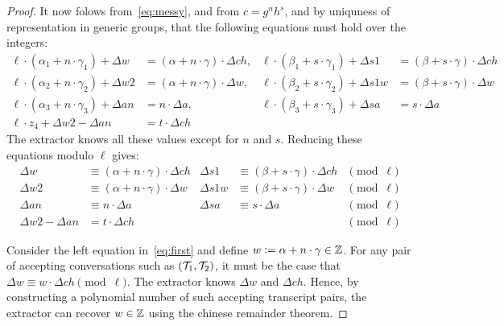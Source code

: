 \documentclass[11pt]{article}
\begin{document}
\begin{proof}
It now folows from~\eqref{eq:messy}, and from $c = g^n h^s$, 
and by uniquness of representation in generic groups,
that the following equations must hold over the integers:
\begin{align*}
  \ell \cdot (\alpha_1 + n \cdot \gamma_1) + \Delta w & = (\alpha + n \cdot \gamma) \cdot \Delta \mathit{ch},  &
  \ell \cdot (\beta_1 + s \cdot \gamma_1) + \Delta \mathit{s1} & = (\beta + s \cdot \gamma) \cdot \Delta \mathit{ch}  
\\
  \ell \cdot (\alpha_2 + n \cdot \gamma_2) + \Delta \mathit{w2} & = (\alpha + n \cdot \gamma) \cdot \Delta w,  &
  \ell \cdot (\beta_2 + s \cdot \gamma_2) + \Delta \mathit{s1w} & = (\beta + s \cdot \gamma) \cdot \Delta w   
\\
  \ell \cdot (\alpha_3 + n \cdot \gamma_3) + \Delta \mathit{an} & = n \cdot \Delta a,  & 
  \ell \cdot (\beta_3 + s \cdot \gamma_3) + \Delta \mathit{sa} & = s \cdot \Delta a   
\\
  \ell \cdot z_4 + \Delta \mathit{w2} - \Delta \mathit{an} & = t \cdot \Delta \mathit{ch} 
\end{align*}
The extractor knows all these values except for $n$ and $s$.
Reducing these equations modulo $\ell$ gives:
\begin{align}
  \Delta w & \equiv (\alpha + n \cdot \gamma) \cdot \Delta \mathit{ch}  &
  \Delta \mathit{s1} & \equiv (\beta + s \cdot \gamma) \cdot \Delta \mathit{ch}  & \pmod{\ell} 
\label{eq:first} \\
  \Delta \mathit{w2} & \equiv (\alpha + n \cdot \gamma) \cdot \Delta w  &
  \Delta \mathit{s1w} & \equiv (\beta + s \cdot \gamma) \cdot \Delta w   & \pmod{\ell} 
\label{eq:second} \\
  \Delta \mathit{an} & \equiv n \cdot \Delta a  & 
  \Delta \mathit{sa} & \equiv s \cdot \Delta a   & \pmod{\ell} 
\label{eq:third} \\
  \Delta \mathit{w2} - \Delta \mathit{an} & = t \cdot \Delta \mathit{ch} 
      &&& \pmod{\ell} 
\label{eq:fourth} 
\end{align}

Consider the left equation in~\eqref{eq:first}
and define $w \mathrel{\mathop:}= \alpha + n \cdot \gamma \in \mathbb Z$.
For any pair of accepting conversations such as $({\cal T}_1, {\cal T}_2)$,
it must be the case that 
$\Delta w \equiv w \cdot \Delta \mathit{ch} \pmod{\ell}$.
The extractor knows $\Delta w$ and $\Delta \mathit{ch}$.
Hence, by constructing a polynomial number of such accepting transcript pairs, 
the extractor can recover $w \in \mathbb Z$ using the chinese remainder theorem. 


\end{proof}
\end{document}
